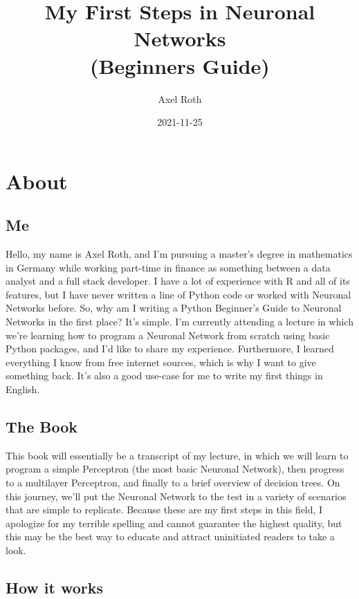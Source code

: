 \documentclass[
]{book}
\title{My First Steps in Neuronal Networks\\
(Beginners Guide)}
\author{Axel Roth}
\date{2021-11-25}
\begin{document}
\maketitle

{
\setcounter{tocdepth}{1}
\tableofcontents
}
\hypertarget{about}{%
\chapter{About}\label{about}}

\hypertarget{me}{%
\section{Me}\label{me}}

Hello, my name is Axel Roth, and I'm pursuing a master's degree in mathematics in Germany while working part-time in finance as something between a data analyst and a full stack developer. I have a lot of experience with R and all of its features, but I have never written a line of Python code or worked with Neuronal Networks before. So, why am I writing a Python Beginner's Guide to Neuronal Networks in the first place? It's simple. I'm currently attending a lecture in which we're learning how to program a Neuronal Network from scratch using basic Python packages, and I'd like to share my experience. Furthermore, I learned everything I know from free internet sources, which is why I want to give something back. It's also a good use-case for me to write my first things in English.

\hypertarget{the-book}{%
\section{The Book}\label{the-book}}

This book will essentially be a transcript of my lecture, in which we will learn to program a simple Perceptron (the most basic Neuronal Network), then progress to a multilayer Perceptron, and finally to a brief overview of decision trees. On this journey, we'll put the Neuronal Network to the test in a variety of scenarios that are simple to replicate. Because these are my first steps in this field, I apologize for my terrible spelling and cannot guarantee the highest quality, but this may be the best way to educate and attract uninitiated readers to take a look.

\hypertarget{how-it-works}{%
\section{How it works}\label{how-it-works}}
\end{document}

